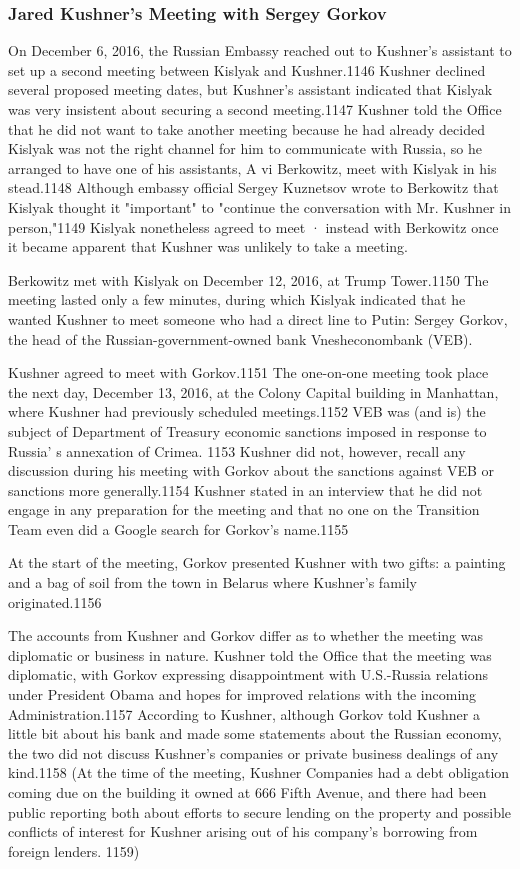 \subsubsection{Jared Kushner's Meeting with Sergey Gorkov}

On December 6, 2016, the Russian Embassy reached out to Kushner's assistant to set up a second meeting between Kislyak and Kushner.1146 Kushner declined several proposed meeting dates, but Kushner's assistant indicated that Kislyak was very insistent about securing a  second meeting.1147 Kushner told the Office that he did not want to take another meeting because he had already decided Kislyak was not the right channel for him to communicate with Russia, so he arranged to have one of his assistants, A vi Berkowitz, meet with Kislyak in his stead.1148 Although embassy official Sergey Kuznetsov wrote to Berkowitz that Kislyak thought it  "important"  to "continue the conversation with Mr. Kushner in person,"1149 Kislyak nonetheless agreed to meet · instead with Berkowitz once it became apparent that Kushner was unlikely to take a meeting.

Berkowitz met with Kislyak on December 12, 2016, at Trump Tower.1150 The meeting lasted only a  few minutes, during which Kislyak indicated that he wanted Kushner to meet someone who had a  direct line to Putin: Sergey  Gorkov, the head of the Russian-government-owned bank Vnesheconombank (VEB).

Kushner agreed to meet with Gorkov.1151 The one-on-one meeting took place the next day, December 13, 2016, at the Colony Capital building in Manhattan, where Kushner had previously scheduled meetings.1152 VEB was (and is) the subject of Department of Treasury economic sanctions imposed in response to Russia' s annexation of Crimea. 1153 Kushner did not, however, recall any discussion during his meeting with Gorkov about the sanctions against VEB or sanctions more generally.1154 Kushner stated in an interview that he did not engage in any preparation for the meeting and that no one on the Transition Team even did a Google search for Gorkov's name.1155

At the start of the meeting, Gorkov presented Kushner with two gifts: a painting and a bag of soil from the town in Belarus where Kushner's family originated.1156

The accounts from Kushner and Gorkov differ as to whether the meeting was diplomatic or business in nature. Kushner told the Office that the meeting was diplomatic,  with Gorkov expressing disappointment with U.S.-Russia relations under President Obama and hopes for improved relations with the incoming Administration.1157 According to Kushner, although Gorkov told Kushner a little bit about his bank and made some statements about the Russian economy, the two did not discuss Kushner's companies or private business dealings of any kind.1158 (At the time of the meeting, Kushner Companies had a debt obligation coming due on the building it owned at 666 Fifth Avenue, and there had been public reporting both about efforts to secure lending on the property and possible conflicts of interest for Kushner arising out of his company's borrowing from foreign lenders. 1159)


